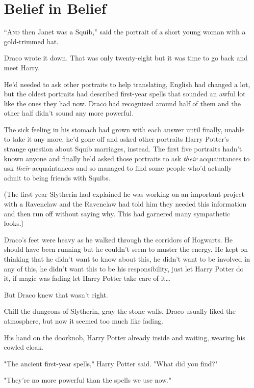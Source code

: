 \chapter{Belief in Belief}

\lettrine{“A}{nd} then Janet was a Squib,'' said the portrait of a short young woman with a 
gold-trimmed hat.

Draco wrote it down. That was only twenty-eight but it was time to go back and 
meet Harry.

He'd needed to ask other portraits to help translating, English had changed a 
lot, but the oldest portraits had described first-year spells that sounded an 
awful lot like the ones they had now. Draco had recognized around half of them 
and the other half didn't sound any more powerful.

The sick feeling in his stomach had grown with each answer until finally, 
unable to take it any more, he'd gone off and asked other portraits Harry 
Potter's strange question about Squib marriages, instead. The first five 
portraits hadn't known anyone and finally he'd asked those portraits to ask 
\emph{their} acquaintances to ask \emph{their} acquaintances and so managed to 
find some people who'd actually admit to being friends with Squibs.

(The first-year Slytherin had explained he was working on an important project 
with a Ravenclaw and the Ravenclaw had told him they needed this information 
and then run off without saying why. This had garnered many sympathetic looks.)

Draco's feet were heavy as he walked through the corridors of Hogwarts. He 
should have been running but he couldn't seem to muster the energy. He kept on 
thinking that he didn't want to know about this, he didn't want to be involved 
in any of this, he didn't want this to be his responsibility, just let Harry 
Potter do it, if magic was fading let Harry Potter take care of it{\ldots}

But Draco knew that wasn't right.

Chill the dungeons of Slytherin, gray the stone walls, Draco usually liked the 
atmosphere, but now it seemed too much like fading.

His hand on the doorknob, Harry Potter already inside and waiting, wearing his 
cowled cloak.

"The ancient first-year spells," Harry Potter said. "What did you find?"

"They're no more powerful than the spells we use now."

